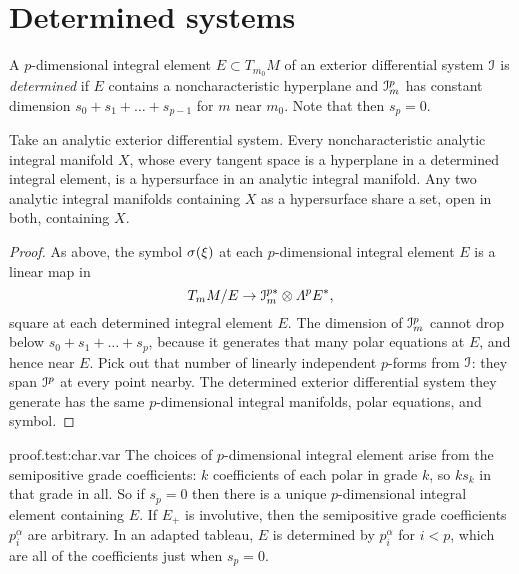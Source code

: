\section{Determined systems}
A \(p\)-dimensional integral element \(E\subset T_{m_0} M\) of an exterior differential system \(\mathcal{I}\) is \emph{determined} if \(E\) contains a noncharacteristic hyperplane and \(\mathcal{I}^p_m\) has constant dimension \(s_0+s_1+\dots+s_{p-1}\) for \(m\) near \(m_0\).
Note that then \(s_p=0\).
\begin{theorem}\label{theorem:CKbaby}
Take an analytic exterior differential system.
Every noncharacteristic analytic integral manifold \(X\), whose every tangent space is a hyperplane in a determined integral element, is a hypersurface in an analytic integral manifold.
Any two analytic integral manifolds containing \(X\) as a hypersurface share a set, open in both, containing \(X\).
\end{theorem}
\begin{proof}
As above, the symbol \(\opsymbol[]{\xi}\) at each \(p\)-dimensional integral element \(E\) is a linear map in
\[
T_m M/E \to \II^{p*}_m \otimes \Lm{p}{E^*},
\]
square at each determined integral element \(E\).
The dimension of \(\mathcal{I}^p_m\) cannot drop below \(s_0+s_1+\dots+s_p\), because it generates that many polar equations at \(E\), and hence near \(E\).
Pick out that number of linearly independent \(p\)-forms from \(\mathcal{I}\): they span \(\mathcal{I}^p\) at every point nearby.
The determined exterior differential system they generate has the same \(p\)-dimensional integral manifolds, polar equations, and symbol.
\end{proof}
\begin{answer}{proof.test:char.var}
The choices of \(p\)-dimensional integral element arise from the semipositive grade coefficients: \(k\) coefficients of each polar in grade \(k\), so \(ks_k\) in that grade in all.
So if \(s_p=0\) then there is a unique \(p\)-dimensional integral element containing \(E\).
If \(E_+\) is involutive, then the semipositive grade coefficients \(p^{\alpha}_i\) are arbitrary.
In an adapted tableau, \(E\) is determined by \(p^{\alpha}_i\) for \(i<p\), which are all of the coefficients just when \(s_p=0\).
\end{answer}

